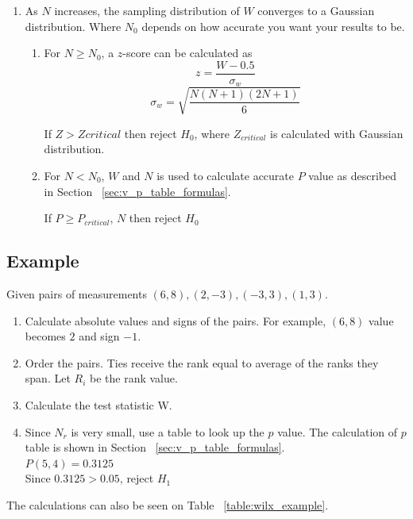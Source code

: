 \documentclass[12pt]{article}
\begin{document}
{\begin{enumerate}
\item
As $N$ increases, the sampling distribution of $W$ converges to a Gaussian distribution. Where $N_0$ depends on how accurate you want your results to be.
\begin{enumerate}
\item
For $N \geq N_0$, a $z$-score can be calculated as
\begin{equation}
  z=\frac{W-0.5}{\sigma_w}
\end{equation}
\begin{equation}
  \sigma_w = \sqrt{\frac{N(N + 1)(2N + 1)}{6}}
\end{equation}

If $Z > Zcritical$ then reject $H_0$, where $Z_{critical}$ is calculated with Gaussian distribution.

\item
For $N < N_0$, $W$ and $N$ is used to calculate accurate $P$ value as described in Section ~\ref{sec:v_p_table_formulas}.

If $ P \geq P_{critical}$, $N$ then reject $H_0$
\end{enumerate}
\end{enumerate}

\subsection{Example}
Given pairs of measurements $(6, 8), (2, -3), (-3, 3), (1, 3)$.

\begin{enumerate}
\item Calculate absolute values and signs of the pairs. For example, $(6, 8)$ value becomes $2$ and sign $-1$.
\item Order the pairs. Ties receive the rank equal to average of the ranks they span. Let $R_i$ be the rank value.
\item Calculate the test statistic W.
\item Since $N_r$ is very small, use a table to look up the $p$ value. The calculation of $p$ table is shown in Section ~\ref{sec:v_p_table_formulas}. \\
$P(5, 4) = 0.3125$ \\
Since $0.3125 > 0.05$, reject $H_1$
\end{enumerate}

The calculations can also be seen on Table ~\ref{table:wilx_example}.

}
\end{document}
